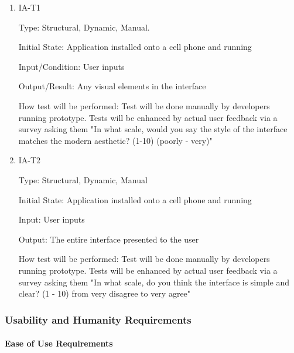\documentclass[12pt, titlepage]{article}
\begin{document}
\begin{enumerate}

\item{IA-T1\\}

Type: Structural, Dynamic, Manual.
					
Initial State: Application installed onto a cell phone and running
					
Input/Condition: User inputs
					
Output/Result: Any visual elements in the interface
					
How test will be performed: Test will be done manually by developers running prototype. Tests will be enhanced by actual user feedback via a survey asking them "In what scale, would you say the style of the interface matches the modern aesthetic? (1-10) (poorly - very)"
					
\item{IA-T2\\}

Type: Structural, Dynamic, Manual
					
Initial State: Application installed onto a cell phone and running
					
Input: User inputs
					
Output: The entire interface presented to the user
					
How test will be performed: Test will be done manually by developers running prototype. Tests will be enhanced by actual user feedback via a survey asking them "In what scale, do you think the interface is simple and clear? (1 - 10) from very disagree to very agree"

\end{enumerate}

\subsubsection{Usability and Humanity Requirements}
		
\paragraph{Ease of Use Requirements}
\end{document}
